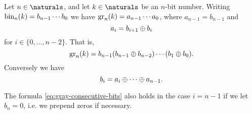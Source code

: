 \documentclass[article, a4paper, 11pt, oneside]{memoir}
\numberwithin{equation}{chapter}
\begin{document}
\begin{proposition}
    Let $n \in \naturals$, and let $k \in \naturals$ be an $n$-bit number. Writing $\bin[n]{k} = b_{n-1} \cdots b_0$ we have $\gray[n]{k} = a_{n-1} \cdots a_0$, where $a_{n-1} = b_{n-1}$ and
    \begin{equation}
        \label{eq:gray-consecutive-bits}
        a_i
            = b_{i+1} \xor b_i
    \end{equation}
    for $i \in \{0, \ldots, n-2\}$. That is,
    \begin{equation*}
        \gray[n]{k}
            = b_{n-1} (b_{n-1} \xor b_{n-2}) \cdots (b_1 \xor b_0).
    \end{equation*}
    Conversely we have
    \begin{equation*}
        b_i
            = a_i \xor \cdots \xor a_{n-1}.
    \end{equation*}
\end{proposition}
%
The formula \cref{eq:gray-consecutive-bits} also holds in the case $i = n-1$ if we let $b_n = 0$, i.e. we prepend zeros if necessary.
\end{document}

